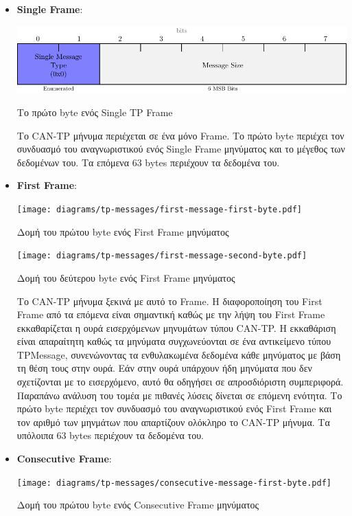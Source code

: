 \documentclass[a4paper,nobib,justified]{tufte-book}
\begin{document}
\begin{itemize}
	\item \textbf{Single Frame}: \begin{marginfigure}
		\includegraphics[width=1\textwidth]{media/diagrams/tp-messages/single-message-first-byte.pdf}
		\label{fig:tp-single-frame-first-byte}
		\caption{Το πρώτο byte ενός Single TP Frame}
	\end{marginfigure} Το CAN-TP μήνυμα περιέχεται σε ένα μόνο Frame. Το πρώτο byte περιέχει τον συνδυασμό του αναγνωριστικού ενός Single Frame μηνύματος και το μέγεθος των δεδομένων του. Τα επόμενα 63 bytes περιέχουν τα δεδομένα του.
	\item \textbf{First Frame}: \begin{marginfigure}
		\centering
		\texttt{[image: diagrams/tp-messages/first-message-first-byte.pdf]}
		\label{fig:tp-first-frame-first-byte}
		\caption{Δομή του πρώτου byte ενός First Frame μηνύματος}
		\goodbreak
		\texttt{[image: diagrams/tp-messages/first-message-second-byte.pdf]}
		\label{fig:tp-first-frame-second-byte}
		\caption{Δομή του δεύτερου byte ενός First Frame μηνύματος}
	\end{marginfigure} Το CAN-TP μήνυμα ξεκινά με αυτό το Frame. Η διαφοροποίηση του First Frame από τα επόμενα είναι σημαντική καθώς με την λήψη του First Frame εκκαθαρίζεται η ουρά εισερχόμενων μηνυμάτων τύπου CAN-TP. Η εκκαθάριση είναι απαραίτητη καθώς τα μηνύματα συγχωνεύονται σε ένα αντικείμενο τύπου TPMessage, συνενώνοντας τα ενθυλακωμένα δεδομένα κάθε μηνύματος με βάση τη θέση τους στην ουρά. Εάν στην ουρά υπάρχουν ήδη μηνύματα που δεν σχετίζονται με το εισερχόμενο, αυτό θα οδηγήσει σε απροσδιόριστη συμπεριφορά. Παραπάνω ανάλυση του τομέα με πιθανές λύσεις δίνεται σε επόμενη ενότητα. Το πρώτο byte περιέχει τον συνδυασμό του αναγνωριστικού ενός First Frame και τον αριθμό των μηνμάτων που απαρτίζουν ολόκληρο το CAN-TP μήνυμα. Τα υπόλοιπα 63 bytes περιέχουν τα δεδομένα του.
	\item \textbf{Consecutive Frame}: \begin{marginfigure}
		\centering
		\texttt{[image: diagrams/tp-messages/consecutive-message-first-byte.pdf]}
		\label{fig:tp-consecutive-frame-first-byte}
		\caption{Δομή του πρώτου byte ενός Consecutive Frame μηνύματος}

\end{marginfigure}
\end{itemize}
\end{document}
